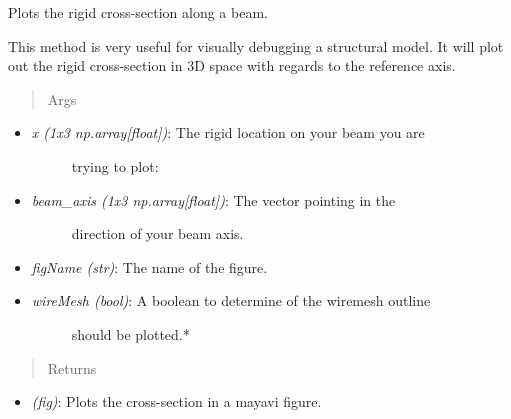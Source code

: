 \documentclass[letterpaper,10pt,english]{sphinxmanual}
\begin{document}
\begin{fulllineitems}

\begin{fulllineitems}
\label{structures:AeroComBAT.Structures.XSect.plotRigid}
Plots the rigid cross-section along a beam.

This method is very useful for visually debugging a structural model.
It will plot out the rigid cross-section in 3D space with regards to
the reference axis.
\begin{quote}\begin{description}
\item[{Args}] \leavevmode
\end{description}\end{quote}
\begin{itemize}
\item {} \begin{description}
\item[{\emph{x (1x3 np.array{[}float{]})}: The rigid location on your beam you are}] \leavevmode
trying to plot:

\end{description}

\item {} \begin{description}
\item[{\emph{beam\_axis (1x3 np.array{[}float{]})}: The vector pointing in the}] \leavevmode
direction of your beam axis.

\end{description}

\item {} 
\emph{figName (str)}: The name of the figure.

\item {} \begin{description}
\item[{\emph{wireMesh (bool)}: A boolean to determine of the wiremesh outline}] \leavevmode
should be plotted.*

\end{description}

\end{itemize}
\begin{quote}\begin{description}
\item[{Returns}] \leavevmode
\end{description}\end{quote}
\begin{itemize}
\item {} 
\emph{(fig)}: Plots the cross-section in a mayavi figure.


\end{itemize}
\end{fulllineitems}
\end{fulllineitems}
\end{document}
